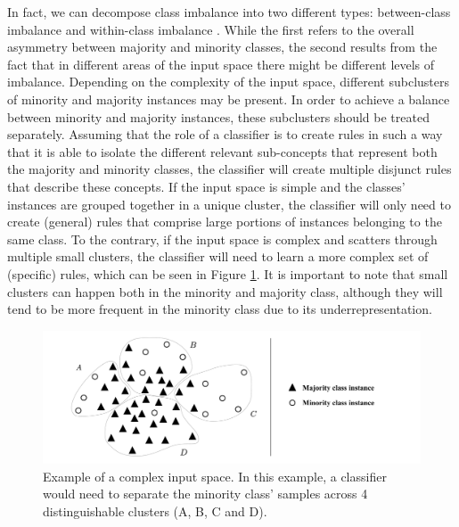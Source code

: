 \documentclass[authoryear,preprint,12pt]{elsarticle}
\begin{document}
\begin{linenumbers}
In fact, we can decompose class imbalance into two different types:
between-class imbalance and within-class imbalance \citep{Douzas2018, Jo2004}.
While the first refers to the overall asymmetry between majority and minority
classes, the second results from the fact that in different areas of the input
space there might be different levels of imbalance. Depending on the
complexity of the input space, different subclusters of minority and majority
instances may be present. In order to achieve a balance between minority and
majority instances, these subclusters should be treated separately. Assuming
that the role of a classifier is to create rules in such a way that it is able
to isolate the different relevant sub-concepts that represent both the
majority and minority classes, the classifier will create multiple disjunct
rules that describe these concepts. If the input space is simple and the
classes’ instances are grouped together in a unique cluster, the classifier
will only need to create (general) rules that comprise large portions of
instances belonging to the same class. To the contrary, if the input space is
complex and scatters through multiple small clusters, the classifier will need
to learn a more complex set of (specific) rules, which can be seen in Figure
\ref{fig:complex_input_space_example}. It is important to note that small
clusters can happen both in the minority and majority class, although they
will tend to be more frequent in the minority class due to its
underrepresentation.  

\begin{figure}[ht]
    \captionsetup{justification=centering}
	\caption{Example of a complex input space. In this example, a classifier
        would need to separate the minority class' samples across 4
        distinguishable clusters (A, B, C and D).
    \vspace{.2cm}}
	\label{fig:complex_input_space_example}
	\includegraphics[width=1\linewidth]{../analysis/complex_input_space_example}
\end{figure}


\end{linenumbers}
\end{document}
